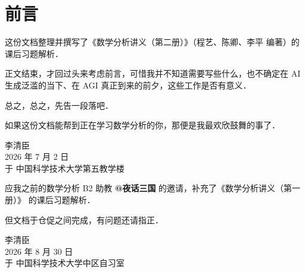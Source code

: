 \chapter{前言}

这份文档整理并撰写了《数学分析讲义（第二册）》\cite{cheng2020shuxue2}（程艺、陈卿、李平 编著）的课后习题解析．

正文结束，才回过头来考虑前言，可惜我并不知道需要写些什么，也不确定在 AI 生成泛滥的当下、在 AGI 真正到来的前夕，这些工作是否有意义．

总之，总之，先告一段落吧．

如果这份文档能帮到正在学习数学分析的你，那便是我最欢欣鼓舞的事了．

\vspace{2em}
\begin{flushright}
    李清臣 \\
    2026 年 7 月 2 日 \\
    于 中国科学技术大学第五教学楼
\end{flushright}

\vspace{2.5em}
\begin{center}
\end{center}
\vspace{2.5em}

应我之前的数学分析 B2 助教 \textbf{@夜话三国} 的邀请，补充了《数学分析讲义（第一册）》\cite{cheng2019shuxue1} 的课后习题解析．

但文档于仓促之间完成，有问题还请指正．

\vspace{2em}
\begin{flushright}
    李清臣 \\
    2026 年 8 月 30 日 \\
    于 中国科学技术大学中区自习室
\end{flushright}

